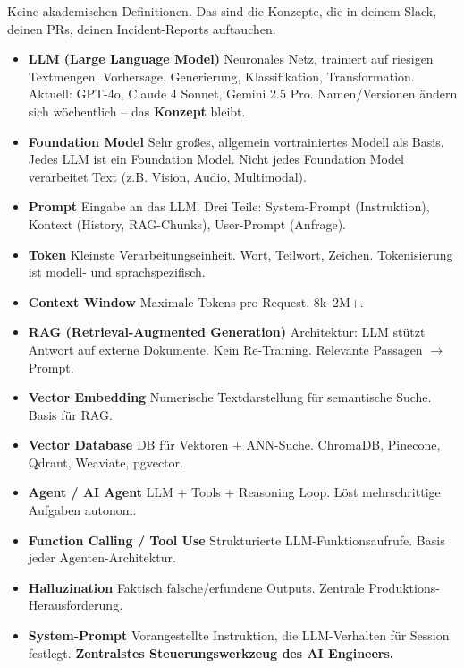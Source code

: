 Keine akademischen Definitionen. Das sind die Konzepte, die in deinem Slack, deinen PRs, deinen Incident-Reports auftauchen.

\begin{itemize}

    \item \textbf{LLM (Large Language Model)} Neuronales Netz, trainiert auf riesigen Textmengen. Vorhersage, Generierung, Klassifikation, Transformation. Aktuell: GPT-4o, Claude 4 Sonnet, Gemini 2.5 Pro. Namen/Versionen ändern sich wöchentlich -- das \textbf{Konzept} bleibt.
    \item \textbf{Foundation Model} Sehr großes, allgemein vortrainiertes Modell als Basis. Jedes LLM ist ein Foundation Model. Nicht jedes Foundation Model verarbeitet Text (z.B. Vision, Audio, Multimodal).
    \item \textbf{Prompt} Eingabe an das LLM. Drei Teile: System-Prompt (Instruktion), Kontext (History, RAG-Chunks), User-Prompt (Anfrage).
    \item \textbf{Token} Kleinste Verarbeitungseinheit. Wort, Teilwort, Zeichen. Tokenisierung ist modell- und sprachspezifisch.
    \item \textbf{Context Window} Maximale Tokens pro Request. 8k--2M+. 
    \item \textbf{RAG (Retrieval-Augmented Generation)} Architektur: LLM stützt Antwort auf externe Dokumente. Kein Re-Training. Relevante Passagen $\rightarrow$ Prompt.
    \item \textbf{Vector Embedding} Numerische Textdarstellung für semantische Suche. Basis für RAG.
    \item \textbf{Vector Database} DB für Vektoren + ANN-Suche. ChromaDB, Pinecone, Qdrant, Weaviate, pgvector.
    \item \textbf{Agent / AI Agent} LLM + Tools + Reasoning Loop. Löst mehrschrittige Aufgaben autonom.
    \item \textbf{Function Calling / Tool Use} Strukturierte LLM-Funktionsaufrufe. Basis jeder Agenten-Architektur.
    \item \textbf{Halluzination} Faktisch falsche/erfundene Outputs. Zentrale Produktions-Herausforderung.
    \item \textbf{System-Prompt} Vorangestellte Instruktion, die LLM-Verhalten für Session festlegt. \textbf{Zentralstes Steuerungswerkzeug des AI Engineers.}
\end{itemize}

